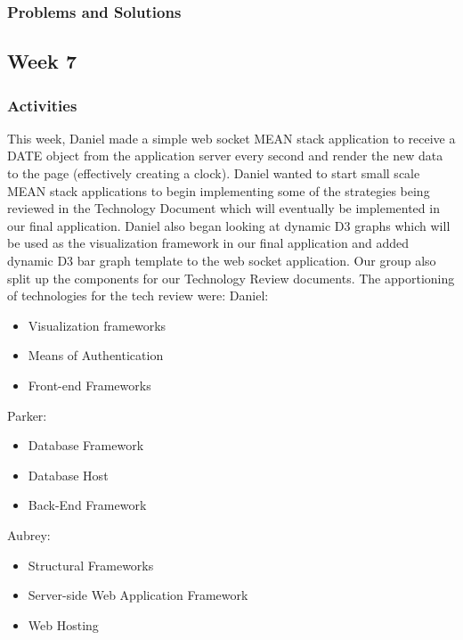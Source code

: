 \documentclass[journal,10pt,onecolumn,compsoc]{IEEEtran} \usepackage[margin=1.0in]{geometry} \usepackage{pdfpages}
\begin{document}
    \subsubsection{Problems and Solutions} 

    \subsection{Week 7}
    \subsubsection{Activities}
    This week, Daniel made a simple web socket MEAN stack application to receive a DATE object from the application server every second and render the new data to the page (effectively creating a clock). Daniel wanted to start small scale MEAN stack applications to begin implementing some of the strategies being reviewed in the Technology Document which will eventually be implemented in our final application. Daniel also began looking at dynamic D3 graphs which will be used as the visualization framework in our final application and added dynamic D3 bar graph template to the web socket application.
    \noindent Our group also split up the components for our Technology Review documents. The apportioning of technologies for the tech review were:
    \noindent Daniel:
    \begin{itemize}
    \item Visualization frameworks
    \item Means of Authentication
    \item Front-end Frameworks
    \end{itemize}
    
    \noindent Parker:
    \begin{itemize}
    \item Database Framework
    \item Database Host
    \item Back-End Framework
    \end{itemize}
    
    \noindent Aubrey:
    \begin{itemize}
    \item Structural Frameworks
    \item Server-side Web Application Framework
    \item Web Hosting
    \end{itemize}
    
\end{document}
